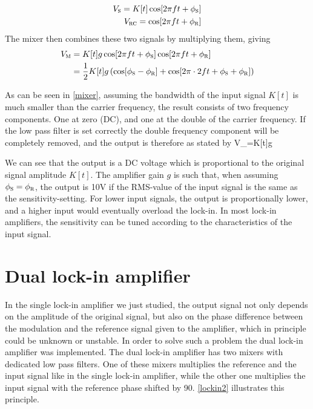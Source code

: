 \begin{align}
V_{\mbox{\footnotesize{\scshape{s}}}}=K[t]\cos[2\pi ft+\phi_{\mbox{\footnotesize{\scshape{s}}}}]
\label{sinusoidal}\\
V_{\mbox{\footnotesize{\scshape{rc}}}}=\cos[2\pi ft+\phi_{\mbox{\footnotesize{\scshape{r}}}}]
\label{reference}
\end{align}
The mixer then combines these two signals by multiplying them, giving
\begin{align}
V_{\mbox{\footnotesize{\scshape{m}}}}&=K[t] g\cos[2\pi ft+\phi_{\mbox{\footnotesize{\scshape{s}}}}]\cos[2\pi ft+\phi_{\mbox{\footnotesize{\scshape{r}}}}]\nonumber\\
&=\frac{1}{2}K[t]g\left(\cos[\phi_{\mbox{\footnotesize{\scshape{s}}}}-\phi_{\mbox{\footnotesize{\scshape{r}}}}]+\cos[2\pi\cdot2ft+\phi_{\mbox{\footnotesize{\scshape{s}}}}+ \phi_{\mbox{\footnotesize{\scshape{r}}}}]\right)\label{mixer}
\end{align}

As can be seen in \cref{mixer}, assuming the bandwidth of the input signal $K[t]$ is much smaller than the carrier frequency, the result consists of two frequency components. One at zero (DC), and one at the double of the carrier frequency. If the low pass filter is set correctly the double frequency component will be completely removed, and the output is therefore as stated by
\mate
V_{}=K[t]g\cos{}
\atem

We can see that the output is a DC voltage which is proportional to the original signal amplitude $K[t]$. The amplifier gain $g$ is such that, when assuming  $\phi_{\mbox{\footnotesize{\scshape{s}}}}=\phi_{\mbox{\footnotesize{\scshape{r}}}}$, the output is 10V if the RMS-value of the input signal is the same as the sensitivity-setting. For lower input signals, the output is proportionally lower, and a higher input would eventually overload the lock-in. In most lock-in amplifiers, the sensitivity can be tuned according to the characteristics of the input signal.

	\section{Dual lock-in amplifier}
	In the single lock-in amplifier we just studied, the output signal not only depends on the amplitude of the original signal, but also 
	on the phase difference between the modulation and the reference signal given to the amplifier, which in principle could be unknown or unstable.
	In order to solve such a problem the dual lock-in amplifier was implemented.
	The dual lock-in amplifier has two mixers with dedicated low pass filters. One of these mixers multiplies the reference and the input signal like in the single lock-in amplifier, while the other one multiplies the input signal with the reference phase shifted by 90\textdegree. \cref{lockin2} illustrates this principle.


